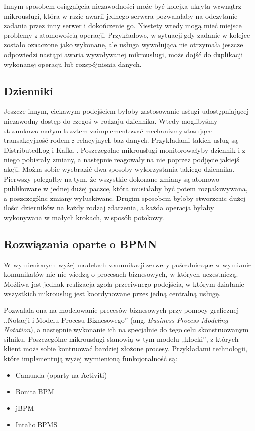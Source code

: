 \documentclass[licencjacka]{pracamgr}
\begin{document}
Innym sposobem osiągnięcia niezawodności może być kolejka ukryta wewnątrz mikrousługi, która w razie awarii jednego serwera pozwalałaby na odczytanie zadania przez inny serwer i dokończenie go. Niestety wtedy mogą mieć miejsce problemy z atomowością operacji. Przykładowo, w sytuacji gdy zadanie w kolejce zostało oznaczone jako wykonane, ale usługa wywołująca nie otrzymała jeszcze odpowiedzi nastąpi awaria wywoływanej mikrousługi, może dojść do duplikacji wykonanej operacji lub rozspójnienia danych.

\subsection{Dzienniki}

Jeszcze innym, ciekawym podejściem byłoby zastosowanie usługi udostępniającej niezawodny dostęp do czegoś w rodzaju dziennika. Wtedy moglibyśmy stosunkowo małym kosztem zaimplementować mechanizmy stosujące transakcyjność rodem z relacyjnych baz danych. Przykładami takich usług są DistributedLog \cite{distibutedlog} i Kafka \cite{kafka}. Poszczególne mikrousługi monitorowałyby dziennik i z niego pobierały zmiany, a następnie reagowały na nie poprzez podjęcie jakiejś akcji. Można sobie wyobrazić dwa sposoby wykorzystania takiego dziennika. Pierwszy polegałby na tym, że wszystkie dokonane zmiany są atomowo publikowane w jednej dużej paczce, która musiałaby być potem rozpakowywana, a poszczególne zmiany wyłuskiwane. Drugim sposobem byłoby stworzenie dużej ilości dzienników na każdy rodzaj zdarzenia, a każda operacja byłaby wykonywana w małych krokach, w sposób potokowy.

\subsection{Rozwiązania oparte o BPMN}
W wymienionych wyżej modelach komunikacji serwery pośredniczące w wymianie
komunikatów nic nie wiedzą o procesach biznesowych, w których uczestniczą. 
Możliwa jest jednak realizacja zgoła przeciwnego podejścia, w którym działanie
wszystkich mikrousług jest koordynowane przez jedną centralną usługę.

Pozwalala ona na modelowanie procesów biznesowych przy pomocy graficznej
,,Notacji i Modelu Procesu Biznesowego'' (ang. \textit{Business Process Modeling
Notation}), a następnie wykonanie ich na specjalnie do tego celu skonstruowanym
silniku. Poszczególne mikrousługi stanowią w tym modelu ,,klocki'', z których
klient może sobie kontruować bardziej złożone procesy. Przykładami technologii,
które implementują wyżej wymienioną funkcjonalność są:
\begin{itemize}
	\item Camunda (oparty na Activiti)
	\item Bonita BPM
	\item jBPM
	\item Intalio BPMS
\end{itemize}
\end{document}
